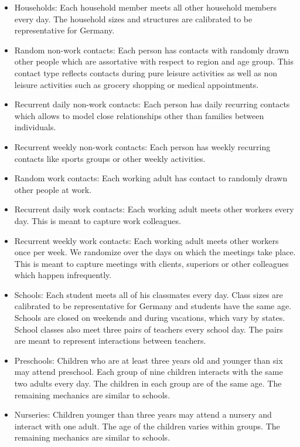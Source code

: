 \begin{itemize}
    \item Households: Each household member meets all other household members every day. The household sizes and structures are calibrated to be representative for Germany.

    \item Random non-work contacts: Each person has contacts with randomly drawn other people which are assortative with respect to region and age group. This contact type reflects contacts during pure leisure activities as well as non leisure activities such as grocery shopping or medical appointments.

    \item Recurrent daily non-work contacts: Each person has daily recurring contacts which allows to model close relationships other than families between individuals.

    \item Recurrent weekly non-work contacts: Each person has weekly recurring contacts like sports groups or other weekly activities.

    \item Random work contacts: Each working adult has contact to randomly drawn other people at work.

    \item Recurrent daily work contacts: Each working adult meets other workers every day. This is meant to capture work colleagues.

    \item Recurrent weekly work contacts: Each working adult meets other workers once per week. We randomize over the days on which the meetings take place. This is meant to capture meetings with clients, superiors or other colleagues which happen infrequently.

    \item Schools: Each student meets all of his classmates every day. Class sizes are calibrated to be representative for Germany and students have the same age. Schools are closed on weekends and during vacations, which vary by states. School classes also meet three pairs of teachers every school day. The pairs are meant to represent interactions between teachers.

    \item Preschools: Children who are at least three years old and younger than six may attend preschool. Each group of nine children interacts with the same two adults every day. The children in each group are of the same age. The remaining mechanics are similar to schools.

    \item Nurseries: Children younger than three years may attend a nursery and interact with one adult. The age of the children varies within groups. The remaining mechanics are similar to schools.
\end{itemize}

